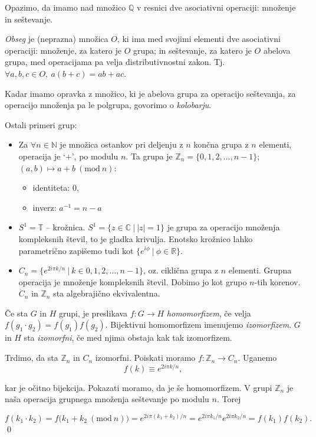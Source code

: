 \ni Opazimo, da imamo nad mno\v zico $\mathbb{Q}$ v resnici dve asociativni operaciji: mno\v zenje in se\v stevanje.

\begin{defin}
	\emph{Obseg} je (neprazna) mno\v zica $O$, ki ima med svojimi elementi dve asociativni operaciji: mno\v zenje, za
	katero je $O$ grupa; in se\v stevanje, za katero je $O$ abelova grupa, med operacijama pa velja distributivnostni zakon.
	Tj. $\forall a,b,c \in O,\ a (b + c) = ab + ac$.
\end{defin}

\ni Kadar imamo opravka z mno\v zico, ki je abelova grupa za operacijo se\v stevanja, za operacijo mno\v zenja pa le polgrupa,
govorimo o \emph{kolobarju}.

Ostali primeri grup:
\begin{itemize}
	\item{Za $\forall n \in \mathbb{N}$ je mno\v zica ostankov pri deljenju z $n$ kon\v cna grupa z $n$ elementi, operacija
		je `$+$', po modulu $n$. Ta grupa je $\mathbb{Z}_n = \{0, 1, 2, \ldots, n-1\};$ $(a,b) \mapsto a + b\ (\text{mod}\ n)$:
		\begin{itemize}
			\item{identiteta: 0,}
			\item{inverz: $a^{-1} = n - a$}
		\end{itemize}}
	\item{$S^1 =\mathbb{T}$ -- kro\v znica. $S^1 = \{z \in \mathbb{C}\ \big|\ |z| = 1\}$ je grupa za operacijo mno\v zenja kompleksnih \v stevil,
		to je gladka krivulja. Enotsko kro\v znico lahko parametri\v cno zapi\v semo tudi kot $\{e^{i\phi}\ |\ \phi \in \mathbb{R}\}$.}
	\item{$C_n = \{e^{2i\pi k/n}\ |\ k \in 0, 1, 2,\ldots,n-1\}$, oz. cikli\v cna grupa z $n$ elementi. Grupna operacija je
		mno\v zenje kompleksnih \v stevil. Dobimo jo kot grupo $n$-tih korenov. $C_n$ in $\mathbb{Z}_n$ sta algebraji\v cno ekvivalentna.}
\end{itemize}

\begin{defin}
	\v Ce sta $G$ in $H$ grupi, je preslikava $f: G \to H$ \emph{homomorfizem}, \v ce velja $f (g_1 \cdot g_2) = f(g_1) f(g_2)$. Bijektivni
	homomorfizem imenujemo \emph{izomorfizem}. $G$ in $H$ sta \emph{izomorfni}, \v ce med njima obstaja kak tak izomorfizem.
\end{defin}

\begin{zgled}
Trdimo, da sta $\mathbb{Z}_n$ in $C_n$ izomorfni. Poiskati moramo $f: \mathbb{Z}_n \to C_n$. Uganemo
\[
	f(k) \equiv e^{2i\pi k/n},
\]

\ni kar je o\v citno bijekcija. Pokazati moramo, da je \v se homomorfizem. V grupi $\mathbb{Z}_n$ je na\v sa operacija
grupnega mno\v zenja se\v stevanje po modulu $n$. Torej

\[
	f (k_1 \cdot k_2) = f\big(k_1 + k_2\ (\text{mod}\ n)\big) = e^{2i\pi (k_1 + k_2)/n} = e^{2i\pi k_1/n}e^{2i\pi
		k_2/n} = f(k_1) f(k_2).
\]
\qed

\end{zgled}

